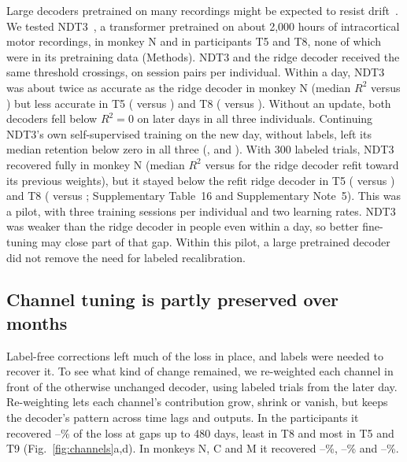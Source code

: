 \documentclass{iopjournal}
\begin{document}
Large decoders pretrained on many recordings might be expected to resist
drift~\cite{ye2023ndt2,azabou2023poyo,ryoo2025possm}. We tested NDT3~\cite{ye2025ndt3}, a
transformer pretrained on about 2,000 hours of intracortical motor recordings, in monkey N and in participants T5 and T8, none of
which were in its pretraining data (Methods). NDT3 and the ridge decoder received the same threshold crossings, on
 session pairs per individual. Within a day, NDT3 was about twice as accurate as the ridge decoder in
monkey N (median $R^2$  versus ) but less accurate in T5 (
versus ) and T8 ( versus ). Without an update, both decoders
fell below $R^2 = 0$ on later days in all three individuals. Continuing NDT3's own self-supervised training on the new day,
without labels, left its median retention below zero in all three (,  and
). With 300 labeled trials, NDT3 recovered fully in monkey N (median $R^2$ 
versus  for the ridge decoder refit toward its previous weights), but it stayed below the refit ridge
decoder in T5 ( versus ) and T8 ( versus
; Supplementary Table~16 and Supplementary Note~5). This was a pilot, with three training sessions
per individual and two learning rates. NDT3 was weaker than the ridge decoder in people even within a day, so better
fine-tuning may close part of that gap. Within this pilot, a large pretrained decoder did not remove the need for
labeled recalibration.

\subsection{Channel tuning is partly preserved over months}

Label-free corrections left much of the loss in place, and labels were needed to recover it. To see what kind of
change remained, we re-weighted each
channel in front of the otherwise unchanged decoder, using labeled trials from the later day. Re-weighting lets each
channel's contribution grow, shrink or vanish, but keeps the decoder's pattern across time lags and outputs. In the
participants it recovered --\% of the loss at gaps up to 480 days, least in T8 and
most in T5 and T9 (Fig.~\ref{fig:channels}a,d). In monkeys N, C and M it recovered
--\%, --\% and --\%.
\end{document}
